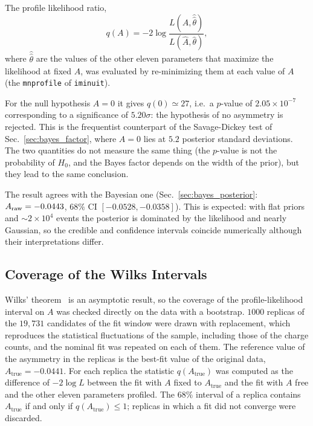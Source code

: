 The profile likelihood ratio,
\[
q(A) = -2\log\frac{L(A,\hat{\hat\theta})}{L(\hat A,\hat\theta)},
\]
where $\hat{\hat\theta}$ are the values of the other eleven parameters that maximize the likelihood at fixed $A$, was evaluated by re-minimizing them at each value of $A$ (the \texttt{mnprofile} of \texttt{iminuit}).


For the null hypothesis $A=0$ it gives $q(0)\simeq27$, i.e.\ a $p$-value of $2.05\times10^{-7}$ corresponding to a significance of $5.20\sigma$: the hypothesis of no asymmetry is rejected. This is the frequentist counterpart of the Savage-Dickey test of Sec.~\ref{sec:bayes_factor}, where $A=0$ lies at $5.2$ posterior standard deviations.%
The two quantities do not measure the same thing (the $p$-value is not the probability of $H_0$, and the Bayes factor depends on the width of the prior), but they lead to the same conclusion.

The result agrees with the Bayesian one (Sec.~\ref{sec:bayes_posterior}: $A_{\mathrm{raw}}=-0.0443$, $68\%$ CI $[-0.0528,-0.0358]$). This is expected: with flat priors and $\sim2\times10^4$ events the posterior is dominated by the likelihood and nearly Gaussian, so the credible and confidence intervals coincide numerically although their interpretations differ.

\subsection{Coverage of the Wilks Intervals}
\label{sec:freq_coverage}

Wilks' theorem~\cite{wilks} is an asymptotic result, so the coverage of the profile-likelihood interval on $A$ was checked directly on the data with a bootstrap. $1000$ replicas of the $19{,}731$ candidates of the fit window were drawn with replacement, which reproduces the statistical fluctuations of the sample, including those of the charge counts, and the nominal fit was repeated on each of them. The reference value of the asymmetry in the replicas is the best-fit value of the original data, $A_{\mathrm{true}}=-0.0441$. For each replica the statistic $q(A_{\mathrm{true}})$ was computed as the difference of $-2\log L$ between the fit with $A$ fixed to $A_{\mathrm{true}}$ and the fit with $A$ free and the other eleven parameters profiled. The $68\%$ interval of a replica contains $A_{\mathrm{true}}$ if and only if $q(A_{\mathrm{true}})\leq1$; replicas in which a fit did not converge were discarded.

